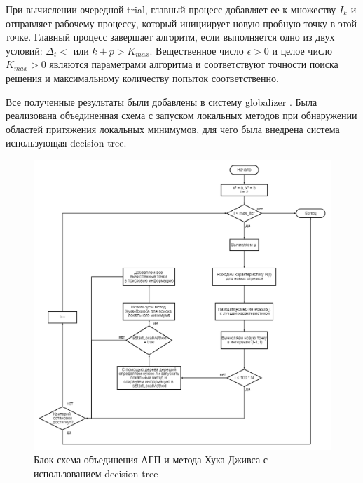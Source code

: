 \documentclass{svproc}
\begin{document}
При вычислении очередной trial, главный процесс добавляет ее к множеству $I_k$ и отправляет рабочему процессу, который инициирует новую пробную точку в этой точке.
Главный процесс завершает алгоритм, если выполняется одно из двух условий: $\Delta_t<$ или $k+p>K_{max}$.
Вещественное число $\epsilon>0$ и целое число $K_{max}>0$ являются параметрами алгоритма и соответствуют точности поиска решения и максимальному количеству попыток соответственно.


Все полученные результаты были добавлены в систему globalizer \cite{fio_bib18}.
Была реализована объединенная схема с запуском локальных методов при обнаружении областей притяжения локальных минимумов, для чего была внедрена система  использующая decision tree.



\begin{figure}[ht!]

	\begin{center}
		\begin{minipage}[h]{0.9\linewidth}
			\includegraphics[width=1\linewidth]{figure/fig3.png}
			\caption{Блок-схема объединения АГП и метода Хука-Дживса с использованием decision tree} %
			\label{fig:fig3}
		\end{minipage}
	\end{center}
\end{figure}
\end{document}
